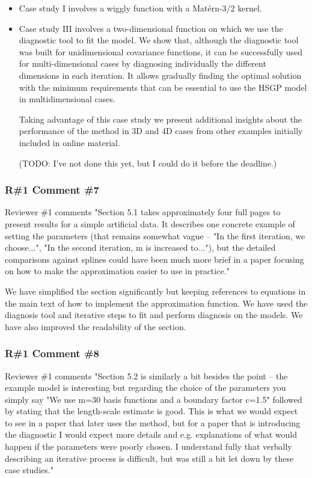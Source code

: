\documentclass[11pt]{report}
\begin{document}
\begin{itemize}
\item Case study I involves a wiggly function with a Mat\'ern-3/2 kernel. 

\item Case study III involves a two-dimensional function on which we use the diagnostic tool to fit the model. We show that, although the diagnostic tool was built for unidimensional covariance functions, it can be successfully used for multi-dimensional cases by diagnosing individually the different dimensions in each iteration. It allows gradually finding the optimal solution with the minimum requirements that can be essential to use the HSGP model in multidimensional cases. 

Taking advantage of this case study we present additional insights about the performance of the method in 3D and 4D cases from other examples initially included in online material.

{\color{red} (TODO: I've not done this yet, but I could do it before the deadline.)}
\end{itemize}

\subsubsection*{R\#1 Comment \#7}

Reviewer \#1 comments "Section 5.1 takes approximately four full pages to present results for a simple artificial data. It describes one concrete example of setting the parameters (that remains somewhat vague -- "In the first iteration, we choose...", "In the second iteration, m is increased to..."), but the detailed comparisons against splines could have been much more brief in a paper focusing on how to make the approximation easier to use in practice."

We have simplified the section significantly but keeping references to equations in the main text of how to implement the approximation function. We have used the diagnosis tool and iterative steps to fit and perform diagnosis on the models. We have also improved the readability of the section.

\subsubsection*{R\#1 Comment \#8}

Reviewer \#1 comments "Section 5.2 is similarly a bit besides the point -- the example model is interesting but regarding the choice of the parameters you simply say "We use m=30 basis functions and a boundary factor c=1.5" followed by stating that the length-scale estimate is good. This is what we would expect to see in a paper that later uses the method, but for a paper that is introducing the diagnostic I would expect more details and e.g. explanations of what would happen if the parameters were poorly chosen. I understand fully that verbally describing an iterative process is difficult, but was still a bit let down by these case studies."
\end{document}
